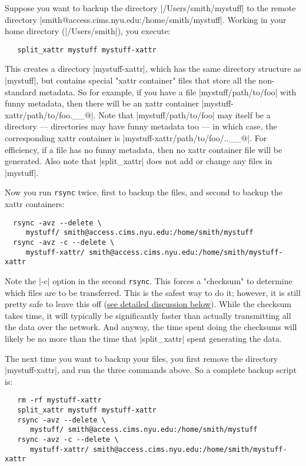 \documentclass[11pt]{article}
\begin{document}
Suppose you want to backup the directory |/Users/smith/mystuff| to the remote
directory |smith@access.cims.nyu.edu:/home/smith/mystuff|.  
Working in your home
directory (|/Users/smith|), you execute:
\begin{Verbatim}
   split_xattr mystuff mystuff-xattr
\end{Verbatim}
This creates a directory |mystuff-xattr|, 
which has the same directory structure
as |mystuff|, but contains special "xattr container" files that store all the
non-standard metadata.  
So for example, if you have a file |mystuff/path/to/foo|
with funny metadata, then there will be an xattr container
|mystuff-xattr/path/to/foo.__@|.  
Note that |mystuff/path/to/foo| may itself be a
directory --- directories may have funny metadata too --- in which case, the
corresponding xattr container is |mystuff-xattr/path/to/foo/..__@|.
For efficiency, if a file has no funny metadata, then no
xattr container file will be generated.
Also note that |split_xattr| does not add or change any files in
|mystuff|.

Now you run \texttt{rsync} twice, first to backup the files,
and second to backup the xattr containers:
\begin{Verbatim}
  rsync -avz --delete \
     mystuff/ smith@access.cims.nyu.edu:/home/smith/mystuff
  rsync -avz -c --delete \
     mystuff-xattr/ smith@access.cims.nyu.edu:/home/smith/mystuff-xattr
\end{Verbatim}

Note the |-c| option in the second \texttt{rsync}.  This forces a "checksum" to
determine which files are to be transferred.  This is the safest way to do it;
however, it is still pretty safe to leave this off (\hyperlink{split-command}{see detailed discussion
below}).  While the checksum takes time, it will typically be significantly
faster than actually transmitting all the data over the network.
And anyway, the time spent doing the checksums will likely
be no more than the time that |split_xattr| spent generating the data.

The next time you want to backup your files, you first remove the directory
|mystuff-xattr|, and run the three commands above.  
So a complete backup script
is:
\begin{Verbatim}
   rm -rf mystuff-xattr
   split_xattr mystuff mystuff-xattr
   rsync -avz --delete \
      mystuff/ smith@access.cims.nyu.edu:/home/smith/mystuff
   rsync -avz -c --delete \
      mystuff-xattr/ smith@access.cims.nyu.edu:/home/smith/mystuff-xattr
\end{Verbatim}
\end{document}
